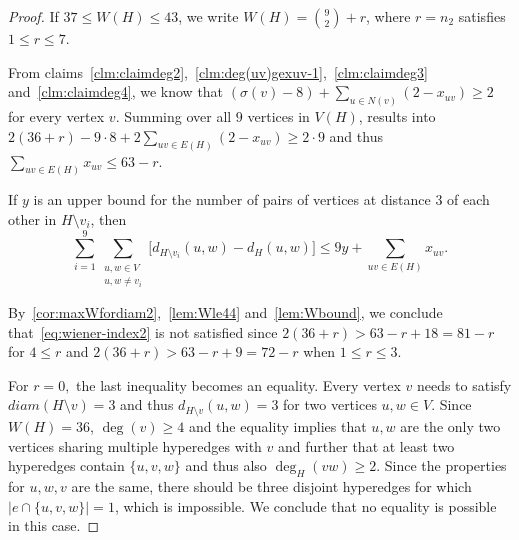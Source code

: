 \documentclass[10pt,a4paper]{amsart}
\newcommand*{\abs}[1]{\lvert #1\rvert}
\newcommand{\diam}{diam}
\begin{document}
\begin{proof}
If $37\le W(H)\le 43$, we write $W(H)=\binom{9}{2}+r$, where $r=n_2$ satisfies $1\le r\le 7$.

From claims~\ref{clm:claimdeg2},~\ref{clm:deg(uv)gexuv-1},~\ref{clm:claimdeg3} and~\ref{clm:claimdeg4}, we know that $(\sigma(v)-8)+\sum_{u \in N(v)} (2-x_{uv})\ge 2$ for every vertex $v$.
Summing over all $9$ vertices in $V(H)$, results into
$2(36+r)-9\cdot 8+2\sum_{uv \in E(H)}(2-x_{uv})\ge 2\cdot 9$ and thus $\sum_{uv \in E(H)} x_{uv}\le 63-r.$

If $y$ is an upper bound for the number of pairs of vertices at distance $3$ of each other in $H \setminus v_i$, then
$$\sum_{i=1}^{9}\sum_{\substack{u, w \in V \\ u, w \neq v_i}} \big[d_{H \setminus v_i}(u, w) - d_H(u, w)\big] \le 9y+ \sum_{uv \in E(H)} x_{uv}. $$

By~\cref{cor:maxWfordiam2},~\cref{lem:Wle44} and~\cref{lem:Wbound}, we conclude  that~\eqref{eq:wiener-index2} is not satisfied since $2(36+r) > 63-r+18=81-r$ for $4 \le r$ and $2(36+r) > 63-r+9=72-r$ when $1 \le r \le 3$.

For $r=0,$ the last inequality becomes an equality. Every vertex $v$ needs to satisfy $\diam(H \setminus v)=3$ and thus $d_{H \setminus v}(u,w)=3$ for two vertices $u,w \in V.$
Since $W(H)=36$, $\deg(v) \ge 4$ and the equality implies that $u,w$ are the only two vertices sharing multiple hyperedges with $v$ and further that at least two hyperedges contain $\{u,v,w\}$ and thus also $\deg_H(vw) \ge 2.$
Since the properties for $u,w,v$ are the same, there should be three disjoint hyperedges for which $\abs{ e \cap \{u,v,w\}}=1$, which is impossible. We conclude that no equality is possible in this case.
\end{proof}
\end{document}
